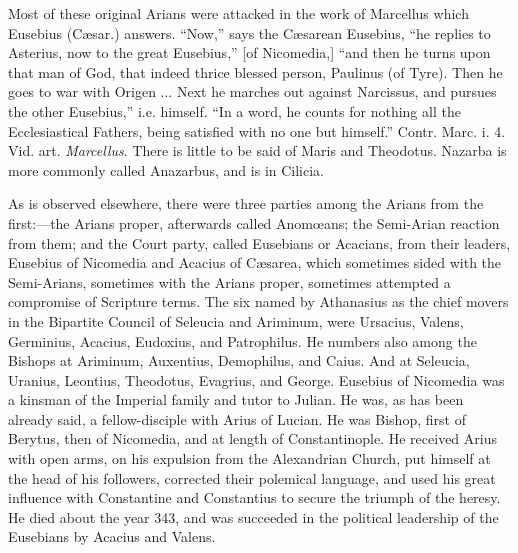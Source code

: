 Most of these original Arians were attacked in
the work of Marcellus which Eusebius (Cæsar.) answers. ``Now,'' says
the Cæsarean Eusebius, ``he replies to Asterius, now to the great
Eusebius,'' [of Nicomedia,] ``and then he turns upon that man of God,
that indeed thrice blessed person, Paulinus (of Tyre). Then he goes to
war with Origen ... Next he marches out against Narcissus, and pursues
the other Eusebius,'' i.e. himself. ``In a word, he counts for nothing
all the Ecclesiastical Fathers, being satisfied with no one but
himself.'' Contr. Marc. i. 4. Vid. art. \emph{Marcellus}. There is
little to be said of Maris and Theodotus. Nazarba is more commonly
called Anazarbus, and is in Cilicia.

As is observed elsewhere, there were three
parties among the Arians from the first:—the Arians proper,
afterwards called Anomœans; the Semi-Arian reaction from them; and
the Court party, called Eusebians or Acacians, from their leaders,
Eusebius of Nicomedia and Acacius of Cæsarea, which sometimes sided
with the Semi-Arians, sometimes with the Arians proper, sometimes
attempted a compromise of Scripture terms. The six named by Athanasius
as the chief movers in the Bipartite Council of Seleucia and Ariminum,
were Ursacius, Valens, Germinius, Acacius, Eudoxius, and Patrophilus.
He numbers also among the Bishops at Ariminum, Auxentius,
Demophilus, and Caius. And at Seleucia, Uranius, Leontius, Theodotus,
Evagrius, and George. Eusebius of Nicomedia was a kinsman of the
Imperial family and tutor to Julian. He was, as has been already said,
a fellow-disciple with Arius of Lucian. He was Bishop, first of
Berytus, then of Nicomedia, and at length of Constantinople. He
received Arius with open arms, on his expulsion from the Alexandrian
Church, put himself at the head of his followers, corrected their
polemical language, and used his great influence with Constantine and
Constantius to secure the triumph of the heresy. He died about the
year 343, and was succeeded in the political leadership of the
Eusebians by Acacius and Valens.

